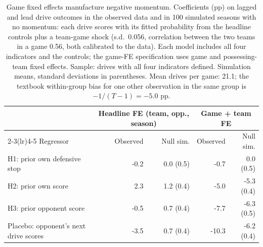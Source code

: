 \begin{table}[htbp]
\centering
\caption{\label{tab:nickell} Game fixed effects manufacture negative momentum. Coefficients (pp) on lagged and lead drive outcomes in the observed data and in 100 simulated seasons with no momentum: each drive scores with its fitted probability from the headline controls plus a team-game shock (s.d.\ 0.056, correlation between the two teams in a game 0.56, both calibrated to the data). Each model includes all four indicators and the controls; the game-FE specification uses game and possessing-team fixed effects. Sample: drives with all four indicators defined. Simulation means, standard deviations in parentheses. Mean drives per game: 21.1; the textbook within-group bias for one other observation in the same group is $-1/(T-1) = -5.0$ pp.}
\begin{tabular}{lrrrr}
\toprule
 & \multicolumn{2}{c}{Headline FE (team, opp., season)} & \multicolumn{2}{c}{Game + team FE} \\
\cmidrule(lr){2-3}\cmidrule(lr){4-5}
Regressor & Observed & Null sim. & Observed & Null sim. \\
\midrule
H1: prior own defensive stop & -0.2 & 0.0 (0.5) & -0.7 & 0.0 (0.5) \\
H2: prior own score & 2.3 & 1.2 (0.4) & -5.0 & -5.3 (0.4) \\
H3: prior opponent score & -0.5 & 0.7 (0.4) & -7.7 & -6.3 (0.5) \\
Placebo: opponent's next drive scores & -3.5 & 0.7 (0.4) & -10.3 & -6.2 (0.4) \\
\bottomrule
\end{tabular}
\end{table}
